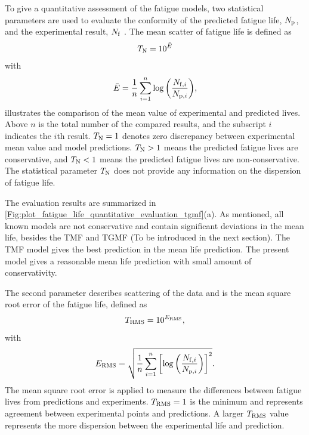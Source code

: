 \documentclass[preprint,5p,twocolumn,10pt,sort&compress]{elsarticle}
\begin{document}
To give a quantitative assessment of the fatigue models, two statistical parameters are used to evaluate the conformity of the predicted fatigue life, $N_{\rm p}$, and the experimental result, $N_{\rm f}$  \cite{KAROLCZUK201439,WALAT201473,SKIBICKI201718, SUN2019228}. 
The mean scatter of fatigue life is defined as
\begin{equation}\label{Equ:TN}
{T_{\rm N}} = {10^{\bar E}}
\end{equation}
with
\begin{equation}
\bar E = \frac{1}{n}\sum\limits_{i = 1}^n {\log \left( {\frac{{{N_{{\rm f},i}}}}{{{N_{{\rm p},i}}}}} \right)},
\end{equation}
{illustrates the comparison of the mean value of experimental and predicted lives. Above $n$ is the total number of the compared results, and the subscript $i$ indicates the $i$th result. $T_{\rm N} = 1$ denotes zero discrepancy between experimental mean value and model predictions. $T_{\rm N} > 1$ means the predicted fatigue lives are conservative, and $T_{\rm N} < 1$ means the predicted fatigue lives are non-conservative. The statistical parameter $T_{\rm N}$ does not provide any information on the dispersion of fatigue life.}

The evaluation results are summarized in \autoref{Fig:plot_fatigue_life_quantitative_evaluation_tgmf}(a). As mentioned, all known models are not conservative and contain significant deviations in the mean life, besides the TMF and TGMF (To be introduced in the next section). The TMF model gives the best prediction in the mean  life prediction. The present model gives a reasonable mean life prediction with small amount of conservativity.

The second parameter describes scattering of the data and is the  mean square root error of the fatigue life, defined as
\begin{equation}\label{Equ:TRMS}
{T_{\rm RMS}} = {10^{{E_{\rm RMS}}}},
\end{equation}
with
\begin{equation}
{E_{\rm RMS}} = \sqrt {\frac{1}{n}\sum\limits_{i = 1}^n {\left[{{\log }}\left( {\frac{{{N_{{\rm f},i}}}}{{{N_{{\rm p},i}}}}} \right) \right]^2}}.
\end{equation}
{The  mean square root error is applied to measure the differences between fatigue lives from predictions and experiments. $T_{\rm RMS} = 1$ is the minimum and represents agreement between experimental points and predictions. A larger $T_{\rm RMS}$ value represents the more dispersion between the experimental life and prediction.}
\end{document}
